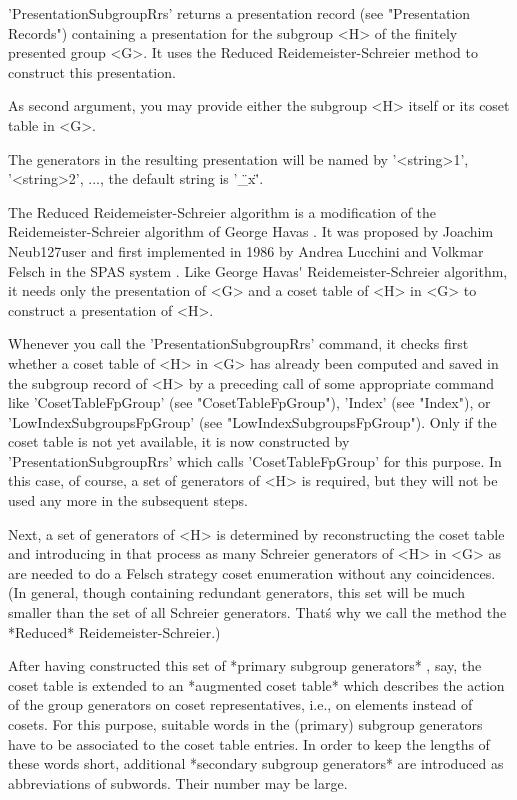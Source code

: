 'PresentationSubgroupRrs'    returns   a    presentation   record    (see
"Presentation Records") containing a presentation for the subgroup <H> of
the    finitely   presented   group   <G>.    It   uses    the    Reduced
Reidemeister-Schreier method to construct this presentation.%

As second argument, you may provide either the subgroup <H> itself or its
coset table in <G>.

The   generators  in  the  resulting  presentation  will   be   named  by
'<string>1', '<string>2', ..., the default string is '\"\_x\"'.

The Reduced  Reidemeister-Schreier algorithm is  a  modification  of  the
Reidemeister-Schreier algorithm of George  Havas  \cite{Hav74b}.   It was
proposed by Joachim Neub{\accent127u}ser and first implemented in 1986 by
Andrea Lucchini and Volkmar Felsch in the SPAS system \cite{Spa89}.  Like
George  Havas{\'}  Reidemeister-Schreier  algorithm,  it  needs only  the
presentation of  <G> and a  coset table  of  <H>  in <G>  to construct  a
presentation of <H>.

Whenever you call  the 'PresentationSubgroupRrs' command, it checks first
whether a  coset table  of <H> in <G> has already been computed and saved
in the subgroup  record of <H> by a  preceding call  of some  appropriate
command like 'CosetTableFpGroup'  (see "CosetTableFpGroup"), 'Index' (see
"Index"), or 'LowIndexSubgroupsFpGroup' (see "LowIndexSubgroupsFpGroup").
Only  if the  coset table is not yet available, it  is now constructed by
'PresentationSubgroupRrs'  which   calls  'CosetTableFpGroup'  for   this
purpose.  In  this  case,  of  course, a set  of  generators  of  <H>  is
required, but they will not be used any more in the subsequent steps.

Next,  a  set of generators of <H> is  determined  by  reconstructing the
coset table and introducing in  that process as many  Schreier generators
of <H> in  <G> as are needed  to do a  Felsch  strategy coset enumeration
without  any  coincidences.  (In  general,  though  containing  redundant
generators,  this set will be  much smaller  than the set of all Schreier
generators.   That\'s   why   we   call    the   method   the   *Reduced*
Reidemeister-Schreier.)

After having constructed this set of *primary subgroup generators* , say,
the coset table is extended to an *augmented coset table* which describes
the  action of the  group generators  on  coset representatives, i.e., on
elements  instead of cosets.  For  this purpose,  suitable words  in  the
(primary) subgroup generators have to  be associated  to  the coset table
entries.  In order to keep the lengths of these words short, additional
*secondary  subgroup  generators*  are  introduced  as  abbreviations  of
subwords. Their number may be large.%
%
%

